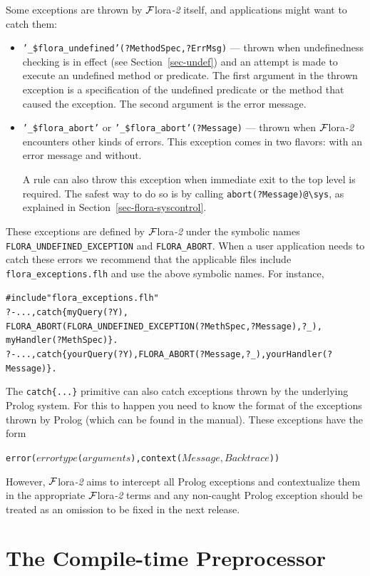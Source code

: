 \documentclass[11pt]{article}
\newcommand{\FLORA}{{\mbox{\sc ${\cal F}${lora}\rm\emph{-2}}}\xspace}
\newcommand{\FLSYSTEM}{\FLORA}
\newcommand{\FLABORT}{FLORA\_ABORT}
\newcommand{\flabort}{'\_\$flora\_abort'}
\newcommand{\FLUNDEFEXCEPTION}{FLORA\_UNDEFINED\_EXCEPTION}
\newcommand{\flundefexception}{'\_\$flora\_undefined'}
\newcommand{\bs}{\textbackslash}
\begin{document}
Some exceptions are thrown by \FLSYSTEM itself, and applications might want
to catch them:
\begin{itemize}
\item {\tt \flundefexception(?MethodSpec,?ErrMsg)} --- thrown when undefinedness checking is
  in effect (see Section~\ref{sec-undef}) and an attempt is made to execute
  an undefined method or predicate. The first argument in the thrown
  exception is a specification of the undefined predicate or the method 
  that caused the exception. The second argument is the error message.
\item {\tt \flabort} or {\tt \flabort(?Message)} ---
  thrown when \FLSYSTEM encounters other kinds of errors. This exception comes
  in two flavors: with an error message and without.

  A rule can also throw this exception when immediate exit to the
  top level is required. The safest way to do so is by calling
  {\tt abort(?Message)@\bs{}sys}, as explained in
  Section~\ref{sec-flora-syscontrol}.
\end{itemize}
\index{\FLUNDEFEXCEPTION}
\index{\FLABORT}
These exceptions are defined by \FLSYSTEM under the symbolic names {\tt
  \FLUNDEFEXCEPTION} and {\tt \FLABORT}. When a user
application needs to catch these errors we recommend that the applicable
files include {\tt flora\_exceptions.flh} 
and use the above symbolic
names. For instance,
\begin{alltt}
#include "flora_exceptions.flh"
?- ..., catch\{myQuery(?Y),
               \FLABORT(\FLUNDEFEXCEPTION(?MethSpec,?Message),?_),
               myHandler(?MethSpec)\}.
?- ..., catch\{yourQuery(?Y),\FLABORT(?Message,?_),yourHandler(?Message)\}.
\end{alltt}

The {\tt catch\{...\}} primitive can also catch exceptions thrown by the
underlying Prolog system. For this to happen you need to know the format
of the exceptions thrown by Prolog (which can
be found in the manual). These exceptions have the form
\begin{alltt}
    error(\ensuremath{errortype}(\ensuremath{arguments}),context(\ensuremath{Message,Backtrace}))
\end{alltt}
However, \FLSYSTEM aims to intercept all Prolog exceptions and
contextualize them in the appropriate \FLSYSTEM terms and any non-caught Prolog
exception should be treated as an omission to be fixed in the next release.


\section{The Compile-time Preprocessor}\label{sec-gpp}
\end{document}
